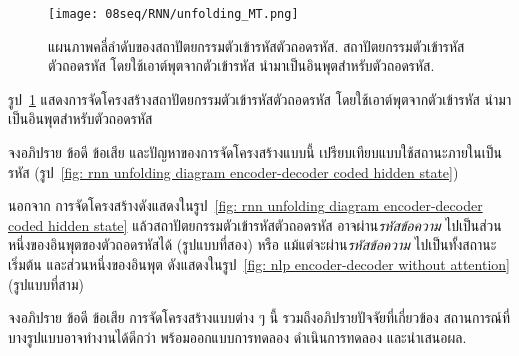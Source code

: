 \begin{figure}
	\begin{center}		
		\texttt{[image: 08seq/RNN/unfolding\_MT.png]}	
		\caption[แผนภาพคลี่ลำดับของสถาปัตยกรรมตัวเข้ารหัสตัวถอดรหัส]{แผนภาพคลี่ลำดับของสถาปัตยกรรมตัวเข้ารหัสตัวถอดรหัส.
			สถาปัตยกรรมตัวเข้ารหัสตัวถอดรหัส โดยใช้เอาต์พุตจากตัวเข้ารหัส นำมาเป็นอินพุตสำหรับตัวถอดรหัส.
		}
		\label{fig: rnn unfolding diagram encoder-decoder}
	\end{center}
\end{figure}
%

\begin{Exercise}
	\label{ex: seq naive encoder-decoder}
	
	รูป~\ref{fig: rnn unfolding diagram encoder-decoder} แสดงการจัดโครงสร้างสถาปัตยกรรมตัวเข้ารหัสตัวถอดรหัส
	โดยใช้เอาต์พุตจากตัวเข้ารหัส นำมาเป็นอินพุตสำหรับตัวถอดรหัส
	
	จงอภิปราย ข้อดี ข้อเสีย และปัญหาของการจัดโครงสร้างแบบนี้ เปรียบเทียบแบบใช้สถานะภายในเป็นรหัส (รูป~\ref{fig: rnn unfolding diagram encoder-decoder coded hidden state})


	
\end{Exercise}



\begin{Exercise}
\label{ex: seq encoder-decoder configuration}

นอกจาก การจัดโครงสร้างดังแสดงในรูป~\ref{fig: rnn unfolding diagram encoder-decoder coded hidden state}
แล้วสถาปัตยกรรมตัวเข้ารหัสตัวถอดรหัส
อาจผ่าน\textit{รหัสข้อความ} ไปเป็นส่วนหนึ่งของอินพุตของตัวถอดรหัสได้ (รูปแบบที่สอง)
หรือ แม้แต่จะผ่าน\textit{รหัสข้อความ} ไปเป็นทั้งสถานะเริ่มต้น และส่วนหนึ่งของอินพุต
ดังแสดงในรูป~\ref{fig: nlp encoder-decoder without attention}
(รูปแบบที่สาม)

จงอภิปราย ข้อดี ข้อเสีย การจัดโครงสร้างแบบต่าง ๆ นี้
รวมถึงอภิปรายปัจจัยที่เกี่ยวข้อง สถานการณ์ที่บางรูปแบบอาจทำงานได้ดีกว่า
พร้อมออกแบบการทดลอง ดำเนินการทดลอง และนำเสนอผล.

%
%

\end{Exercise}



